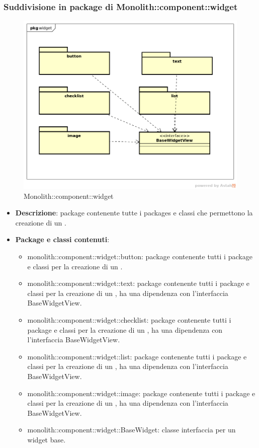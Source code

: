 \subsubsection{Suddivisione in package  di Monolith::component::widget}
\label{Monolith::component::widget}
\begin{figure}[H]
	\centering
	\includegraphics[scale=0.5]{Sezioni/imgPackage/component_widget.png}
	\caption{Monolith::component::widget}
\end{figure}
\begin{itemize}
	\item{\textbf{Descrizione}}: package contenente tutte i packages e classi che permettono la creazione di un .
	\item{\textbf{Package e classi contenuti}}:
	\begin{itemize}
	\item{monolith::component::widget::button}: package contenente tutti i package e classi per la creazione di un .
	\item{monolith::component::widget::text}: package contenente tutti i package e classi per la creazione di un , ha una dipendenza con l'interfaccia BaseWidgetView.
	\item{monolith::component::widget::checklist}: package contenente tutti i package e classi per la creazione di un , ha una dipendenza con l'interfaccia BaseWidgetView.
	\item{monolith::component::widget::list}: package contenente tutti i package e classi per la creazione di un , ha una dipendenza con l'interfaccia BaseWidgetView.
	\item{monolith::component::widget::image}: package contenente tutti i package e classi per la creazione di un , ha una dipendenza con l'interfaccia BaseWidgetView.
	\item{monolith::component::widget::BaseWidget}: classe interfaccia per un widget base.
	\end{itemize}
	
\end{itemize}

